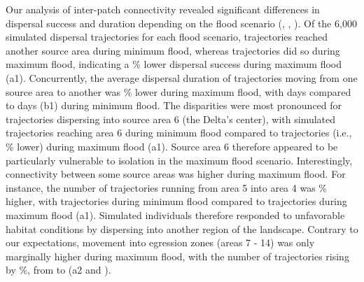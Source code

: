 \documentclass[../FinalThesis.tex]{subfiles}
\begin{document}
Our analysis of inter-patch connectivity revealed significant differences in
dispersal success and duration depending on the flood scenario (,
, ). Of the 6,000 simulated dispersal
trajectories for each flood scenario,
 trajectories reached
another source area during minimum flood, whereas
 trajectories did so
during maximum flood, indicating a
\% lower
dispersal success during maximum flood (a1). Concurrently, the
average dispersal duration of trajectories moving from one source area to
another was
\% lower
during maximum flood, with
 days compared to
 days
(b1) during minimum flood. The disparities were most pronounced
for trajectories dispersing into source area 6 (the Delta's center), with
 simulated trajectories reaching
area 6 during minimum flood compared to
 trajectories (i.e.,
\% lower) during maximum
flood (a1). Source area 6 therefore appeared to be particularly
vulnerable to isolation in the maximum flood scenario. Interestingly,
connectivity between some source areas was higher during maximum flood. For
instance, the number of trajectories running from area 5 into area 4 was
\% higher, with
 trajectories during minimum flood
compared to  trajectories during
maximum flood (a1). Simulated individuals therefore responded to
unfavorable habitat conditions by dispersing into another region of the
landscape. Contrary to our expectations, movement into egression zones (areas 7
- 14) was only marginally higher during maximum flood, with the number of
trajectories rising by \%, from
 to 
(a2 and ).
\end{document}
